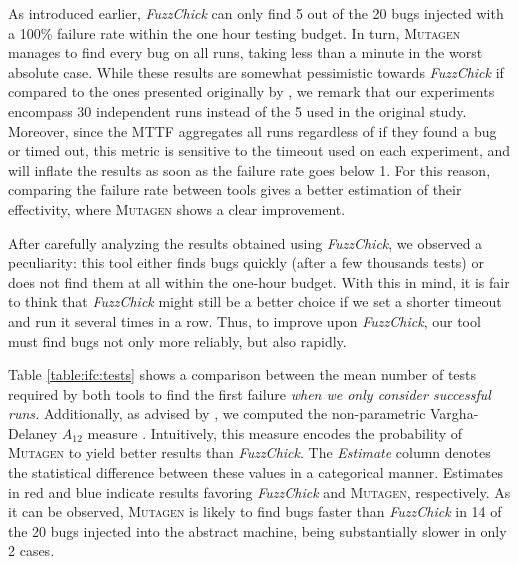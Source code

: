 \documentclass[sigconf,review,anonymous]{acmart}
\newcommand{\fuzzchick}{\textit{FuzzChick}\xspace}
\newcommand{\mutagen}{\textsc{Mutagen}\xspace}
\begin{document}
As introduced earlier, \fuzzchick can only find 5 out of the 20 bugs injected
with a 100\% failure rate within the one hour testing budget.
%
In turn, \mutagen manages to find every bug on all runs, taking less than a
minute in the worst absolute case.
%
While these results are somewhat pessimistic towards \fuzzchick if compared to
the ones presented originally by \citeauthor{lampropoulos2019coverage}, we
remark that our experiments encompass 30 independent runs instead of the 5 used
in the original study.
%
Moreover, since the MTTF aggregates all runs regardless of if they found a bug
or timed out, this metric is sensitive to the timeout used on each experiment,
and will inflate the results as soon as the failure rate goes below 1.
%
For this reason, comparing the failure rate between tools gives a better
estimation of their effectivity, where \mutagen shows a clear improvement.

After carefully analyzing the results obtained using \fuzzchick, we observed a
peculiarity:
%
this tool either finds bugs quickly (after a few thousands tests) or does not
find them at all within the one-hour budget.
%
With this in mind, it is fair to think that \fuzzchick might still be a better
choice if we set a shorter timeout and run it several times in a row.
%
Thus, to improve upon \fuzzchick, our tool must find bugs not only more
reliably, but also rapidly.


Table \ref{table:ifc:tests} shows a comparison between the mean number of tests
required by both tools to find the first failure \emph{when we only consider
  successful runs.}
%
Additionally, as advised by \citeauthor{arcuri2014hitchhiker}
\cite{arcuri2014hitchhiker}, we computed the non-parametric Vargha-Delaney
$A_{12}$ measure \cite{vargha2000critique}.
%
Intuitively, this measure encodes the probability of \mutagen to yield better
results than \fuzzchick.
%
The \textit{Estimate} column denotes the statistical difference between these
values in a categorical manner.
%
Estimates in {\color{red} red} and {\color{blue} blue} indicate results
favoring \fuzzchick and \mutagen, respectively.
%
As it can be observed,
%
%
\mutagen is likely to find bugs faster than \fuzzchick in 14 of the 20 bugs
injected into the abstract machine, being substantially slower in only 2 cases.
\end{document}
